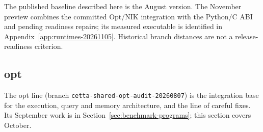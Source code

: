 \documentclass[11pt]{article}
\newcommand{\code}[1]{\texttt{#1}}
\begin{document}
The published baseline described here is the August version.  The November
preview combines the committed Opt/NIK integration with the Python/C ABI and
pending readiness repairs; its measured executable is identified in
Appendix~\ref{app:runtimes-20261105}.  Historical branch distances are not
a release-readiness criterion.

\subsection{opt}
\label{sec:line-opt}

The opt line (branch \code{cetta-shared-opt-audit-20260807}) is the
integration base for the execution, query and memory architecture, and the
line of careful fixes.  Its September work is in
Section~\ref{sec:benchmark-programs}; this section covers October.
\end{document}
